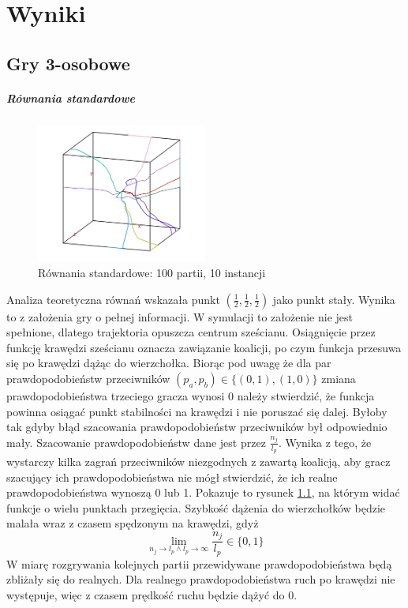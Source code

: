 \chapter{Wyniki}
\label{cha:wyniki}

\section{Gry 3-osobowe}
\label{sec:N3nzal}

\paragraph{Równania standardowe}
\label{sec:r_stan}
\begin{figure}
    \centering
    \includegraphics[width=0.5\textwidth]{pict/wyniki/stand100_10.png}   
    \caption{Równania standardowe: 100 partii, 10 instancji}
	\label{fig:stand100_10} 
\end{figure}

Analiza teoretyczna równań wskazała punkt $(\frac{1}{2},\frac{1}{2},\frac{1}{2})$ jako punkt stały. Wynika to z założenia gry o pełnej informacji. W symulacji to założenie nie jest spełnione, dlatego trajektoria opuszcza centrum sześcianu. Osiągnięcie przez funkcję krawędzi sześcianu oznacza zawiązanie koalicji, po czym funkcja przesuwa się po krawędzi dążąc do wierzchołka. Biorąc pod uwagę że dla par prawdopodobieństw przeciwników $(p_a,p_b) \in \{(0,1),(1,0)\}$ zmiana prawdopodobieństwa trzeciego gracza wynosi $0$ należy stwierdzić, że funkcja powinna osiągać punkt stabilności na krawędzi i nie poruszać się dalej. Byłoby tak gdyby błąd szacowania prawdopodobieństw przeciwników był odpowiednio mały. Szacowanie prawdopodobieństw dane jest przez $\frac{n_{j}}{l_p}$. Wynika z tego, że wystarczy kilka zagrań przeciwników niezgodnych z zawartą koalicją, aby gracz szacujący ich prawdopodobieństwa nie mógł stwierdzić, że ich realne prawdopodobieństwa wynoszą 0 lub 1. Pokazuje to rysunek \ref{fig:stand100_10}, na którym widać funkcje o wielu punktach przegięcia. Szybkość dążenia do wierzchołków będzie malała wraz z czasem spędzonym na krawędzi, gdyż
\[\lim_{n_j\rightarrow l_p \wedge l_p \rightarrow \infty} \frac{n_j}{l_p} \in \{0,1\} \]
W miarę rozgrywania kolejnych partii przewidywane prawdopodobieństwa będą zbliżały się do realnych. Dla realnego prawdopodobieństwa ruch po krawędzi nie występuje, więc z czasem prędkość ruchu będzie dążyć do 0.
